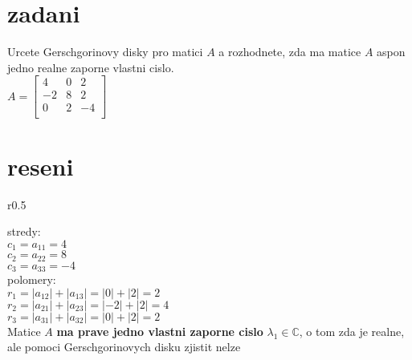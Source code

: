 \documentclass[a4paper]{article}
\begin{document}
\section*{zadani}
Urcete Gerschgorinovy disky pro matici $A$
a rozhodnete, zda ma matice $A$
aspon jedno realne zaporne vlastni cislo.\\
$A=
\begin{bmatrix}
	4 & 0 & 2\\
	-2 & 8 & 2\\
	0 & 2 & -4 \\
\end{bmatrix}
$


\section*{reseni}

\begin{wrapfigure}{r}{0.5\linewidth}
\end{wrapfigure}

stredy:\\
\indent$c_1=a_{11}=4$\\
\indent$c_2=a_{22}=8$\\
\indent$c_3=a_{33}=-4$\\
polomery:\\
\indent$r_1=|a_{12}|+|a_{13}|=|0|+|2|=2$\\
\indent$r_2=|a_{21}|+|a_{23}|=|-2|+|2|=4$\\
\indent$r_3=|a_{31}|+|a_{32}|=|0|+|2|=2$\\
Matice $A$ \textbf{ma prave jedno vlastni zaporne cislo} $\lambda_1\in\mathbb{C}$,
o tom zda je realne, ale pomoci Gerschgorinovych disku zjistit nelze
\end{document}
